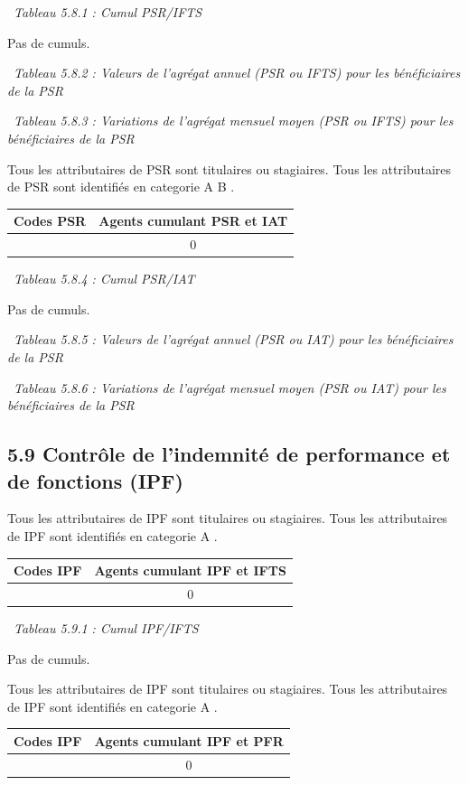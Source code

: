 ~\emph{Tableau 5.8.1 : Cumul PSR/IFTS}

Pas de cumuls.

~\emph{Tableau 5.8.2 : Valeurs de l'agrégat annuel (PSR ou IFTS) pour
les bénéficiaires de la PSR}

~\emph{Tableau 5.8.3 : Variations de l'agrégat mensuel moyen (PSR ou
IFTS) pour les bénéficiaires de la PSR}

Tous les attributaires de PSR sont titulaires ou stagiaires. Tous les
attributaires de PSR sont identifiés en categorie A B .

\begin{longtable}[]{@{}cc@{}}
\toprule
Codes PSR & Agents cumulant PSR et IAT\tabularnewline
\midrule
\endhead
& 0\tabularnewline
\bottomrule
\end{longtable}

~\emph{Tableau 5.8.4 : Cumul PSR/IAT}

Pas de cumuls.

~\emph{Tableau 5.8.5 : Valeurs de l'agrégat annuel (PSR ou IAT) pour les
bénéficiaires de la PSR}

~\emph{Tableau 5.8.6 : Variations de l'agrégat mensuel moyen (PSR ou
IAT) pour les bénéficiaires de la PSR}

\hypertarget{controle-de-lindemnite-de-performance-et-de-fonctions-ipf}{%
\subsection{5.9 Contrôle de l'indemnité de performance et de fonctions
(IPF)}\label{controle-de-lindemnite-de-performance-et-de-fonctions-ipf}}

Tous les attributaires de IPF sont titulaires ou stagiaires. Tous les
attributaires de IPF sont identifiés en categorie A .

\begin{longtable}[]{@{}cc@{}}
\toprule
Codes IPF & Agents cumulant IPF et IFTS\tabularnewline
\midrule
\endhead
& 0\tabularnewline
\bottomrule
\end{longtable}

~\emph{Tableau 5.9.1 : Cumul IPF/IFTS}

Pas de cumuls.

Tous les attributaires de IPF sont titulaires ou stagiaires. Tous les
attributaires de IPF sont identifiés en categorie A .

\begin{longtable}[]{@{}cc@{}}
\toprule
Codes IPF & Agents cumulant IPF et PFR\tabularnewline
\midrule
\endhead
& 0\tabularnewline
\bottomrule
\end{longtable}

